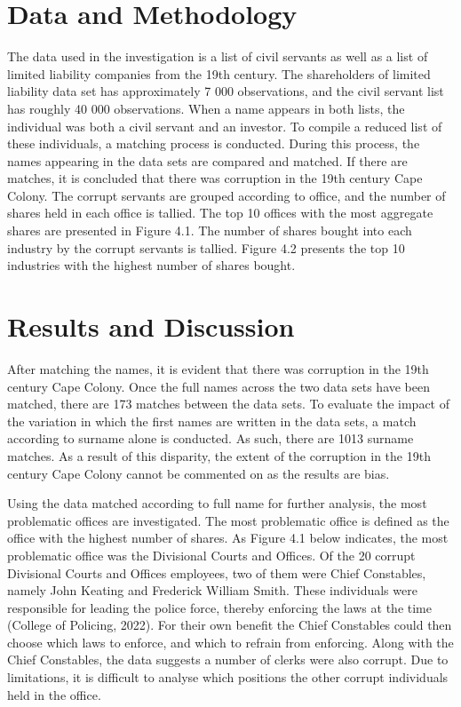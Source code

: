 \documentclass[12pt,preprint, authoryear]{elsarticle}
\numberwithin{equation}{section}
\numberwithin{figure}{section}
\numberwithin{table}{section}
\begin{document}
\hypertarget{data-and-methodology}{%
\section{Data and Methodology}\label{data-and-methodology}}

The data used in the investigation is a list of civil servants as well
as a list of limited liability companies from the 19th century. The
shareholders of limited liability data set has approximately 7 000
observations, and the civil servant list has roughly 40 000
observations. When a name appears in both lists, the individual was both
a civil servant and an investor. To compile a reduced list of these
individuals, a matching process is conducted. During this process, the
names appearing in the data sets are compared and matched. If there are
matches, it is concluded that there was corruption in the 19th century
Cape Colony. The corrupt servants are grouped according to office, and
the number of shares held in each office is tallied. The top 10 offices
with the most aggregate shares are presented in Figure 4.1. The number
of shares bought into each industry by the corrupt servants is tallied.
Figure 4.2 presents the top 10 industries with the highest number of
shares bought.

\hypertarget{results-and-discussion}{%
\section{Results and Discussion}\label{results-and-discussion}}

After matching the names, it is evident that there was corruption in the
19th century Cape Colony. Once the full names across the two data sets
have been matched, there are 173 matches between the data sets. To
evaluate the impact of the variation in which the first names are
written in the data sets, a match according to surname alone is
conducted. As such, there are 1013 surname matches. As a result of this
disparity, the extent of the corruption in the 19th century Cape Colony
cannot be commented on as the results are bias.

Using the data matched according to full name for further analysis, the
most problematic offices are investigated. The most problematic office
is defined as the office with the highest number of shares. As Figure
4.1 below indicates, the most problematic office was the Divisional
Courts and Offices. Of the 20 corrupt Divisional Courts and Offices
employees, two of them were Chief Constables, namely John Keating and
Frederick William Smith. These individuals were responsible for leading
the police force, thereby enforcing the laws at the time (College of
Policing, 2022). For their own benefit the Chief Constables could then
choose which laws to enforce, and which to refrain from enforcing. Along
with the Chief Constables, the data suggests a number of clerks were
also corrupt. Due to limitations, it is difficult to analyse which
positions the other corrupt individuals held in the office.
\end{document}
